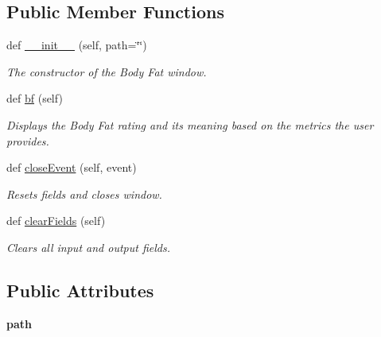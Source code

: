 \subsection*{Public Member Functions}
\begin{DoxyCompactItemize}
\item 
def \hyperlink{class_body_fat__ui_1_1_b_f_window_a3ee0d136b0b25e045fd9a8a6356819b1}{\+\_\+\+\_\+init\+\_\+\+\_\+} (self, path=\char`\"{}\char`\"{})
\begin{DoxyCompactList}\small\item\em The constructor of the Body Fat window. \end{DoxyCompactList}\item 
def \hyperlink{class_body_fat__ui_1_1_b_f_window_a1c3b98d97dc41255235c5e739980b16f}{bf} (self)
\begin{DoxyCompactList}\small\item\em Displays the Body Fat rating and its meaning based on the metrics the user provides. \end{DoxyCompactList}\item 
\mbox{\label{class_body_fat__ui_1_1_b_f_window_a25e504f2540df47b7c81d7febf5eeec2}} 
def \hyperlink{class_body_fat__ui_1_1_b_f_window_a25e504f2540df47b7c81d7febf5eeec2}{close\+Event} (self, event)
\begin{DoxyCompactList}\small\item\em Resets fields and closes window. \end{DoxyCompactList}\item 
\mbox{\label{class_body_fat__ui_1_1_b_f_window_a24594a009a7f736a732253c4d7304c24}} 
def \hyperlink{class_body_fat__ui_1_1_b_f_window_a24594a009a7f736a732253c4d7304c24}{clear\+Fields} (self)
\begin{DoxyCompactList}\small\item\em Clears all input and output fields. \end{DoxyCompactList}\end{DoxyCompactItemize}
\subsection*{Public Attributes}
\begin{DoxyCompactItemize}
\item 
\mbox{\label{class_body_fat__ui_1_1_b_f_window_a22747b4a05d316e1ac4d9421051427b5}} 
{\bfseries path}
\end{DoxyCompactItemize}


